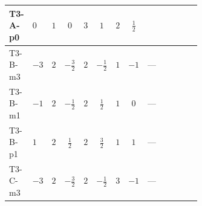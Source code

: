 \documentclass[8pt]{article}
\begin{document}
\begin{landscape}
\begin{longtable}{@{}llcccccc >{\raggedright\arraybackslash}p{0.21\linewidth} >{\raggedright\arraybackslash}p{0.21\linewidth} >{\raggedright\arraybackslash}p{0.21\linewidth}@{}}
\midrule
T3-A-p0 & $0$ & $1$ & $0$ & $3$ & $1$ & $2$ & $\frac{1}{2}$ & \scriptsize\adjustbox{max width=\linewidth}{$\begin{gathered} -\frac{15 {g_1}^2 {\lambda_{HS_2}^{(1)}}}{2}\end{gathered}$} & \scriptsize\adjustbox{max width=\linewidth}{$\begin{gathered} +2 {\lambda_{12}^{(1)}} {\lambda_{HS_1}^{(1)}}\end{gathered}$} & \scriptsize\adjustbox{max width=\linewidth}{$\begin{gathered} +6 {\lambda_1} {\lambda_{HS_2}^{(1)}}\end{gathered}$} \\
\midrule
T3-B-m3 & $-3$ & $2$ & $-\frac{3}{2}$ & $2$ & $-\frac{1}{2}$ & $1$ & $-1$ & --- & \scriptsize\adjustbox{max width=\linewidth}{$\begin{gathered} +4 {\lambda_{12}^{(1)}} {\lambda_{HS_1}^{(1)}}\end{gathered}$} & \scriptsize\adjustbox{max width=\linewidth}{$\begin{gathered} +6 {\lambda_1} {\lambda_{HS_2}^{(1)}}\end{gathered}$} \\
\midrule
T3-B-m1 & $-1$ & $2$ & $-\frac{1}{2}$ & $2$ & $\frac{1}{2}$ & $1$ & $0$ & --- & \scriptsize\adjustbox{max width=\linewidth}{$\begin{gathered} +4 {\lambda_{12}^{(1)}} {\lambda_{HS_1}^{(1)}}\end{gathered}$} & \scriptsize\adjustbox{max width=\linewidth}{$\begin{gathered} +6 {\lambda_1} {\lambda_{HS_2}^{(1)}}\end{gathered}$} \\
\midrule
T3-B-p1 & $1$ & $2$ & $\frac{1}{2}$ & $2$ & $\frac{3}{2}$ & $1$ & $1$ & --- & \scriptsize\adjustbox{max width=\linewidth}{$\begin{gathered} +4 {\lambda_{12}^{(1)}} {\lambda_{HS_1}^{(1)}}\end{gathered}$} & \scriptsize\adjustbox{max width=\linewidth}{$\begin{gathered} +6 {\lambda_1} {\lambda_{HS_2}^{(1)}}\end{gathered}$} \\
\midrule
T3-C-m3 & $-3$ & $2$ & $-\frac{3}{2}$ & $2$ & $-\frac{1}{2}$ & $3$ & $-1$ & --- & \scriptsize\adjustbox{max width=\linewidth}{$\begin{gathered} +4 {\lambda_{12}^{(1)}} {\lambda_{HS_1}^{(1)}}\end{gathered}$} & \scriptsize\adjustbox{max width=\linewidth}{$\begin{gathered} +6 {\lambda_1} {\lambda_{HS_2}^{(1)}}\end{gathered}$} \\

\end{longtable}
\end{landscape}
\end{document}
